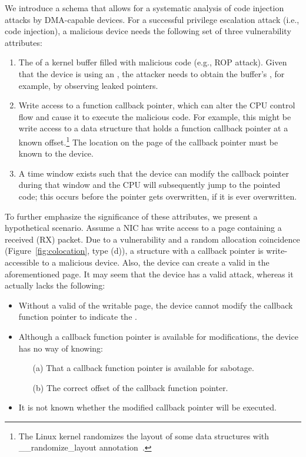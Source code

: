 We introduce a schema that allows for a systematic analysis of code injection attacks by DMA-capable devices.
For a successful privilege escalation attack (i.e., code injection), a malicious device needs the following set of three vulnerability attributes:
\begin{enumerate}
    \item The \kva{} of a kernel buffer filled with malicious code (e.g., ROP attack). Given that the device is using an \iova, the attacker needs to obtain the buffer's \kva{}, for example, by observing leaked pointers. 
    \item Write access to a function callback pointer, which can alter the CPU control flow and cause it to execute the malicious code. For example, this might be write access to a data structure that holds a function callback pointer at a known offset.\footnote{The Linux kernel randomizes the layout of some data structures with \_\_randomize\_layout annotation~\cite{rand_layout}.} The location on the page of the callback pointer must be known to the device.
    \item A time window exists such that the device can modify the callback pointer during that window and the CPU will subsequently jump to the pointed code; this occurs before the pointer gets overwritten, if it is ever overwritten.
\end{enumerate}

To further emphasize the significance of these attributes, we present a hypothetical scenario. Assume a NIC has write access to a page containing a received (RX) packet. Due to a \subpage{} vulnerability and a random allocation coincidence (Figure~\ref{fig:colocation}, type (d)), a structure with a callback pointer is write-accessible to a malicious device. Also, the device can create a valid \mabaf{} in the aforementioned page. It may seem that the device has a valid attack, whereas it actually lacks the following:

\begin{itemize}
    \item Without a valid \kva{} of the writable page, the device cannot modify the callback function pointer to indicate the \mabaf.
    \item Although a callback function pointer is available for modifications, the device has no way of knowing: 
    \begin{enumerate}
        \item[(a)] That a callback function pointer is available for sabotage.
        \item[(b)] The correct offset of the callback function pointer.
    \end{enumerate}
    \item It is not known whether the modified callback pointer will be executed.
\end{itemize}


